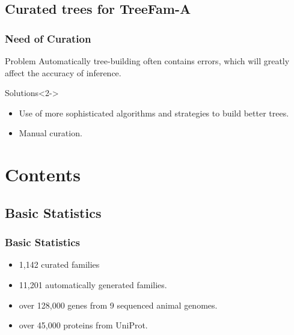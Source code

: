 \documentclass{beamer}
\begin{document}
\subsection{Curated trees for TreeFam-A}
\frame
{
	\frametitle{Need of Curation}
	\begin{alertblock}{Problem}
		Automatically tree-building often contains errors, which will greatly affect the accuracy of inference.
	\end{alertblock}
	\begin{block}{Solutions}<2->
		\begin{itemize}
			\item<2-> \alert<2>{Use of more sophisticated algorithms and strategies to build better trees.}
			\item<3-> \alert<3>{Manual curation.}
		\end{itemize}
	\end{block}
}
\section{Contents}
\subsection{Basic Statistics}
\frame
{
	\frametitle{Basic Statistics}
	\begin{itemize}
	\item<1-> 1,142 curated families
	\item<1-> 11,201 automatically generated families.
	\item<2-> over 128,000 genes from 9 sequenced animal genomes.
	\item<2-> over 45,000 proteins from UniProt.
	\end{itemize}
}
\end{document}

